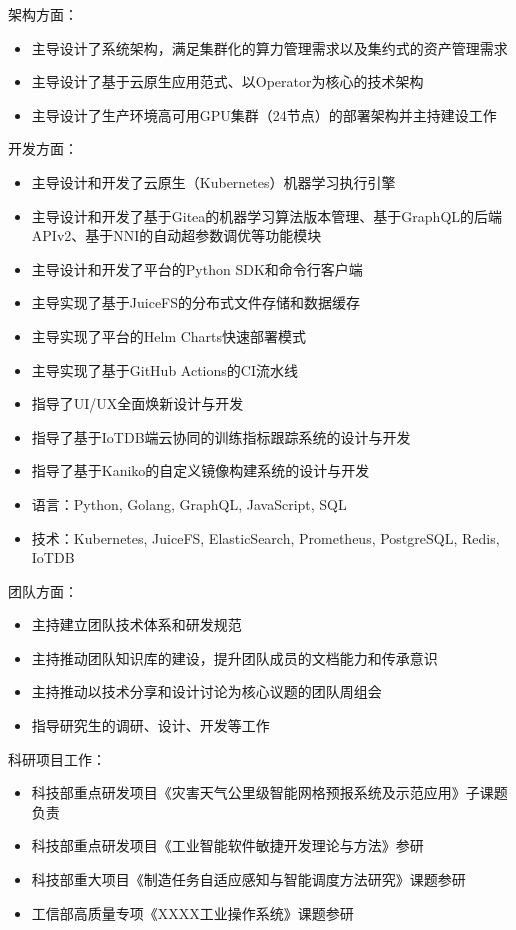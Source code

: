\documentclass[letterpaper]{twentysecondcv} %
\begin{document}
\begin{twentyfluid}
{{\begin{itemize}
    \end{itemize}
    架构方面：
    \vspace{-0.1cm}
    \begin{itemize}
        \item 主导设计了系统架构，满足集群化的算力管理需求以及集约式的资产管理需求
        \item 主导设计了基于云原生应用范式、以Operator为核心的技术架构
        \item 主导设计了生产环境高可用GPU集群（24节点）的部署架构并主持建设工作
    \end{itemize}
    开发方面：
    \vspace{-0.1cm}
    \begin{itemize}
        \item 主导设计和开发了云原生（Kubernetes）机器学习执行引擎
        \item 主导设计和开发了基于Gitea的机器学习算法版本管理、基于GraphQL的后端APIv2、基于NNI的自动超参数调优等功能模块
        \item 主导设计和开发了平台的Python SDK和命令行客户端
        \item 主导实现了基于JuiceFS的分布式文件存储和数据缓存
        \item 主导实现了平台的Helm Charts快速部署模式
        \item 主导实现了基于GitHub Actions的CI流水线
        \item 指导了UI/UX全面焕新设计与开发
        \item 指导了基于IoTDB端云协同的训练指标跟踪系统的设计与开发
        \item 指导了基于Kaniko的自定义镜像构建系统的设计与开发
        \item 语言：Python, Golang, GraphQL, JavaScript, SQL
        \item 技术：Kubernetes, JuiceFS, ElasticSearch, Prometheus, PostgreSQL, Redis, IoTDB
    \end{itemize}
    团队方面：
    \vspace{-0.1cm}
    \begin{itemize}
        \item 主持建立团队技术体系和研发规范
        \item 主持推动团队知识库的建设，提升团队成员的文档能力和传承意识
        \item 主持推动以技术分享和设计讨论为核心议题的团队周组会
        \item 指导研究生的调研、设计、开发等工作
    \end{itemize}
    科研项目工作：
    \vspace{-0.1cm}
    \begin{itemize}
        \item 科技部重点研发项目《灾害天气公里级智能网格预报系统及示范应用》子课题负责
        \item 科技部重点研发项目《工业智能软件敏捷开发理论与方法》参研
        \item 科技部重大项目《制造任务自适应感知与智能调度方法研究》课题参研
        \item 工信部高质量专项《XXXX工业操作系统》课题参研
    \end{itemize}
    }
    }
\end{twentyfluid}
\end{document}
